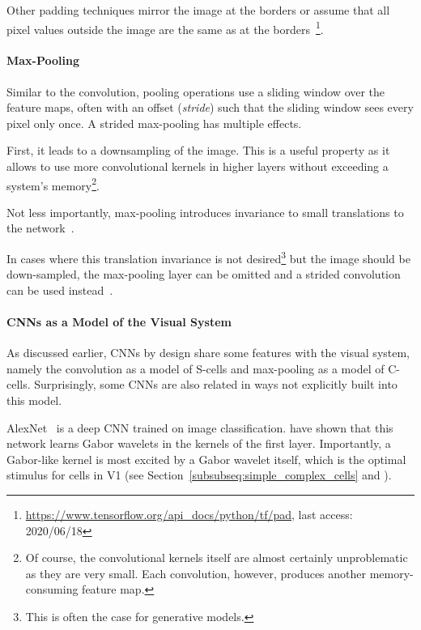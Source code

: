 Other padding techniques mirror the image at the borders or assume that all pixel values outside the image are the same as at the borders~\footnote{\href{https://www.tensorflow.org/api\_docs/python/tf/pad}{https://www.tensorflow.org/api\_docs/python/tf/pad}, last access: 2020/06/18}.

\paragraph{Max-Pooling}
Similar to the convolution, pooling operations use a sliding window over the feature maps, often with an offset (\textit{stride}) such that the sliding window sees every pixel only once.
A strided max-pooling has multiple effects.

First, it leads to a downsampling of the image.
This is a useful property as it allows to use more convolutional kernels in higher layers without exceeding a system's memory\footnote{Of course, the convolutional kernels itself are almost certainly unproblematic as they are very small. Each convolution, however, produces another memory-consuming feature map.}.

Not less importantly, max-pooling introduces invariance to small translations to the network~\citep[p. 342]{Goodfellow-et-al-2016}.

In cases where this translation invariance is not desired\footnote{This is often the case for generative models.} but the image should be down-sampled, the max-pooling layer can be omitted and a strided convolution can be used instead~\citep[p. 337]{Goodfellow-et-al-2016}.

\paragraph{\acp{CNN} as a Model of the Visual System}
As discussed earlier, \acp{CNN} by design share some features with the visual system, namely the convolution as a model of S-cells and max-pooling as a model of C-cells.
Surprisingly, some \acp{CNN} are also related in ways not explicitly built into this model.

AlexNet~\citep{krizhevsky2012imagenet} is a deep \ac{CNN} trained on image classification.
\citet{krizhevsky2012imagenet} have shown that this network learns Gabor wavelets in the kernels of the first layer.
Importantly, a Gabor-like kernel is most excited by a Gabor wavelet itself, which is the optimal stimulus for cells in \ac{V1} (see Section~\ref{subsubseq:simple_complex_cells} and \citet{jones1987evaluation}).

